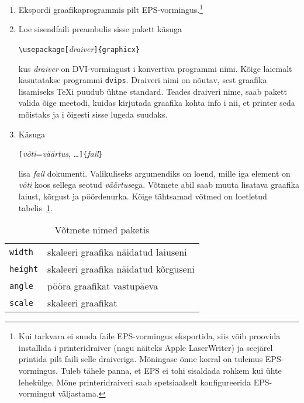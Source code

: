 \begin{enumerate}
  \item Ekspordi graafikaprogrammis pilt EPS-vormingus.\footnote{Kui
tarkvara ei suuda faile EPS-vormingus eksportida, siis võib proovida
installida \PSi i printeridraiver (nagu näiteks Apple LaserWriter) ja
seejärel printida pilt faili selle draiveriga. Mõningase õnne korral on
tulemus EPS-vormingus. Tuleb tähele panna, et EPS ei tohi sisaldada
rohkem kui ühte lehekülge. Mõne printeridraiveri saab spetsiaalselt
konfigureerida EPS-vormingut väljastama.}
  \item Loe sisendfaili preambulis sisse pakett  käsuga
\begin{lscommand}
\verb|\usepackage[|\emph{draiver}\verb|]{graphicx}|
\end{lscommand}
\noindent kus \emph{draiver} on DVI-vormingust \PSi i konvertiva
programmi nimi. Kõige laiemalt kasutatakse programmi
\texttt{dvips}.
Draiveri nimi on nõutav, sest graafika lisamiseks \TeX i puudub ühtne
standard. Teades draiveri nime, saab pakett  valida õige
meetodi, kuidas kirjutada graafika kohta info i nii, et
printer seda mõistaks ja i õigesti sisse lugeda suudaks.
  \item Käsuga
\begin{lscommand}
\verb|[|\emph{võti}=\emph{väärtus}, \ldots\verb|]{|\emph{fail}\verb|}|
\end{lscommand}
\noindent lisa \emph{fail} dokumenti. Valikuliseks argumendiks on loend,
mille iga element on \emph{võti} koos sellega seotud \emph{väärtus}ega.
Võtmete abil saab muuta lisatava graafika laiust, kõrgust ja
pöördenurka. Kõige tähtsamad võtmed on loetletud tabelis~\ref{keyvals}.
\end{enumerate}

\begin{table}[htb]
\caption{Võtmete nimed paketis }
\label{keyvals}
\begin{lined}{9cm}
\begin{tabular}{@{}ll}
\texttt{width}& skaleeri graafika näidatud laiuseni\\
\texttt{height}& skaleeri graafika näidatud kõrguseni\\
\texttt{angle}& pööra graafikat vastupäeva\\
\texttt{scale}& skaleeri graafikat\\
\end{tabular}

\bigskip
\end{lined}
\end{table}

